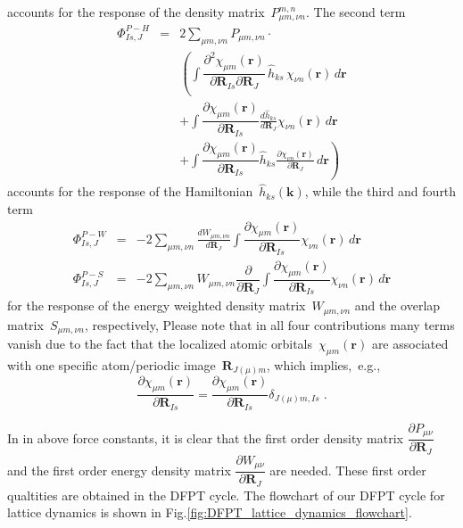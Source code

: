 accounts for the response of the density matrix~$P_{\mu m,\nu n}^{m,n}$. The second term 
\begin{eqnarray}
\Phi_{Is,J}^{P-H} & = &  
2\sum_{\mu m,\nu n}  
P_{\mu m,\nu n} \cdot\\ 
&&\left(
\int  \dfrac{\partial^2 \chi_{\mu m}(\mathbf{r})}{\partial  \mathbf{R}_{Is}\partial  \mathbf{R}_{J} }\,\hat{h}_{ks}\, \chi_{\nu n}(\mathbf{r}) \, d\mathbf{r}\right.\\
&&+\int  \dfrac{\partial \chi_{\mu m}(\mathbf{r})}{\partial  \mathbf{R}_{Is} }\frac{d \hat{h}_{ks}}{d\mathbf{R}_{J}}\chi_{\nu n}(\mathbf{r}) \, d\mathbf{r}\\
&&\left.+\int  \dfrac{\partial \chi_{\mu m}(\mathbf{r})}{\partial  \mathbf{R}_{Is} }\hat{h}_{ks}\frac{\partial \chi_{\nu n}(\mathbf{r})}{\partial \mathbf{R}_{J}} \, d\mathbf{r}
\right)
\end{eqnarray}
accounts for the response of the Hamiltonian~$\hat{h}_{ks}(\mathbf{k})$, while the third  and fourth term
\begin{eqnarray}
\Phi_{Is,J}^{P-W} & = &  - 2\sum_{\mu m,\nu n }
\frac{d W_{\mu m,\nu n}}{d\mathbf{R}_{J}}
\int  \dfrac{\partial \chi_{\mu m}(\mathbf{r})}{\partial  \mathbf{R}_{Is} }\chi_{\nu n}(\mathbf{r}) \, d\mathbf{r}
\label{PhiPW}\\
\Phi_{Is,J}^{P-S} & = &  - 2\sum_{\mu m,\nu n } 
W_{\mu m,\nu n} \dfrac{\partial}{\partial\mathbf{R}_{J} }
\int  \dfrac{\partial \chi_{\mu m}(\mathbf{r})}{\partial  \mathbf{R}_{Is} }\chi_{\nu n}(\mathbf{r}) \, d\mathbf{r} \label{PhiPS}
\end{eqnarray}
for the response of the energy weighted density matrix~$W_{\mu m,\nu n}$ and the overlap matrix~$S_{\mu m,\nu n}$, 
respectively, 
Please note that in all four contributions many terms vanish due to the fact that the localized atomic orbitals~$\chi_{\mu m}(\mathbf{r})$ are associated with one specific atom/periodic image~$\mathbf{R}_{J(\mu) m}$, which implies,~e.g.,
\begin{equation}
\frac{\partial \chi_{\mu m}(\mathbf{r})}{\partial \mathbf{R}_{Is}} = 
\frac{\partial \chi_{\mu m}(\mathbf{r})}{\partial \mathbf{R}_{Is}} \delta_{J(\mu)m,Is} \; .
\end{equation}

In in above force constants, it is clear that the first order density matrix $\dfrac{\partial  P_{\mu\nu}}{\partial {\mathbf{R}_{J} }}$ and the 
first order energy density matrix $\dfrac{\partial  W_{\mu\nu}}{\partial {\mathbf{R}_{J} }}$ are needed. These first order qualtities are obtained in the DFPT cycle. The flowchart of our DFPT
cycle for lattice dynamics is shown in Fig.\ref{fig:DFPT_lattice_dynamics_flowchart}.

